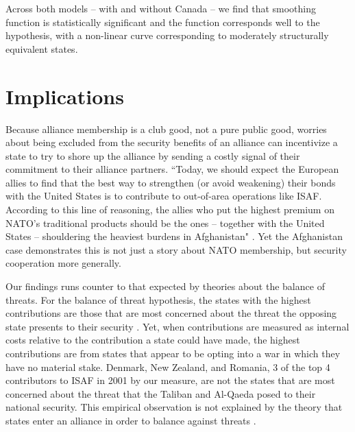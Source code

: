 \documentclass[12pt,letterpaper]{article}
\begin{document}
	Across both models -- with and without Canada -- we find that smoothing function is statistically significant and the function corresponds well to the hypothesis, with a non-linear curve corresponding to moderately structurally equivalent states.

\section{Implications}
	Because alliance membership is a club good, not a pure public good, worries about being excluded from the security benefits of an alliance can incentivize a state to try to shore up the alliance by sending a costly signal of their commitment to their alliance partners. ``Today, we should expect the European allies to find that the best way to strengthen (or avoid weakening) their bonds with the United States is to contribute to out-of-area operations like ISAF. According to this line of reasoning, the allies who put the highest premium on NATO’s traditional products should be the ones – together with the United States – shouldering the heaviest burdens in Afghanistan" \citep[331]{ringsmose_natoburdensharingredux_2010}. Yet the Afghanistan case demonstrates this is not just a story about NATO membership, but security cooperation more generally.

	Our findings runs counter to that expected by theories about the balance of threats. For the balance of threat hypothesis, the states with the highest contributions are those that are most concerned about the threat the opposing state presents to their security \citep{haesebrouck_democraticparticipationair_2016}. Yet, when contributions are measured as internal costs relative to the contribution a state could have made, the highest contributions are from states that appear to be opting into a war in which they have no material stake. Denmark, New Zealand, and Romania, 3 of the top 4 contributors to ISAF in 2001 by our measure, are not the states that are most concerned about the threat that the Taliban and Al-Qaeda posed to their national security. This empirical observation is not explained by the theory that states enter an alliance in order to balance against threats \citep{walt_originsalliance_1987}.
\end{document}
